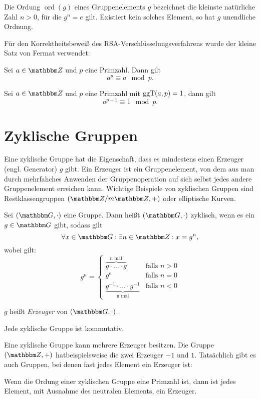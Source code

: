\begin{definition}
  Die Ordung $\operatorname{ord}(g) $ eines Gruppenelements $g$
  bezeichnet die kleinste 
  natürliche Zahl $n>0$, für die $g^n = e$ gilt. Existiert kein solches
  Element, so hat $g$ unendliche Ordnung.
 \end{definition}

Für den Korrektheitsbeweiß des RSA-Verschlüsselungsverfahrens wurde der
kleine Satz von Fermat verwendet: 
 \begin{theorem}
   Sei $a \in \Z{}$ und $p$ eine
   Primzahl. Dann gilt
   \[a^{p} \equiv a \mod p\text{.}\]
 \end{theorem}
 Sei $a\in\Z{}$ und $p$ eine Primzahl mit $\operatorname{ggT}(a, p)=1$, dann gilt
 \[a^{p-1}\equiv 1\mod p\text{.}\]
\section{Zyklische Gruppen}
Eine zyklische Gruppe hat die Eigenschaft, dass es mindestens einen
Erzeuger (engl. Generator) $g$
gibt. Ein Erzeuger ist ein Gruppenelement, von dem aus man durch
mehrfahches Anwenden der Gruppenoperation auf sich selbst
jedes andere Gruppenelement erreichen kann. Wichtige Beispiele von
zyklischen Gruppen sind Restklassengruppen $(\Z{}/m\Z{}, +)$ oder
elliptische Kurven.

\begin{definition}
  Sei $(\G, \cdot)$ eine Gruppe. Dann heißt $(\G, \cdot)$ zyklisch, wenn
  es ein $g \in \G$ gibt, sodass gilt
  \[
    \forall x \in \G: \exists n \in \Z{}: x=g^n,
  \]
  wobei gilt:
\[
 g^n = 
  \begin{cases} 
   \overbrace{g \cdot \dotsc \cdot g}^{\text{n mal}} & \text{falls } n > 0 \\
   g^e       & \text{falls } n = 0 \\
   \underbrace{g^{-1} \cdot \dotsc \cdot g^{-1}}_{\text{n mal}} &
   \text{falls }n < 0
  \end{cases}
\]

$g$ heißt \textit{Erzeuger} von $(\G, \cdot)$. 
\end{definition}

\begin{theorem}
Jede zyklische Gruppe ist kommutativ.  
\end{theorem}

Eine zyklische Gruppe kann mehrere Erzeuger besitzen. Die Gruppe $(\Z{},
+)$ hatbeispielsweise die zwei Erzeuger $-1$ und $1$. Tatsächlich gibt es auch
Gruppen, bei denen fast jedes Element ein Erzeuger ist: 
\begin{theorem} 
Wenn die Ordung einer zyklischen Gruppe eine Primzahl ist, dann ist
jedes Element, mit Ausnahme des neutralen Elements, ein Erzeuger. 
\end{theorem}

